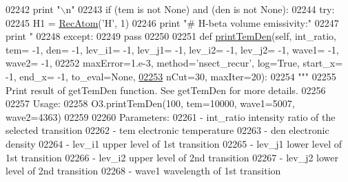 \begin{DoxyCode}
{{{{{{{{{{{{{02242             \textcolor{keywordflow}{print} \textcolor{stringliteral}{"\(\backslash\)n"}
02243         \textcolor{keywordflow}{if} (tem \textcolor{keywordflow}{is} \textcolor{keywordflow}{not} \textcolor{keywordtype}{None}) \textcolor{keywordflow}{and} (den \textcolor{keywordflow}{is} \textcolor{keywordflow}{not} \textcolor{keywordtype}{None}):
02244             \textcolor{keywordflow}{try}:
02245                 H1 = \hyperlink{classpyneb_1_1core_1_1pynebcore_1_1_rec_atom}{RecAtom}(\textcolor{stringliteral}{'H'}, 1)
02246                 \textcolor{keywordflow}{print} \textcolor{stringliteral}{"# H-beta volume emissivity:"}
02247                 \textcolor{keywordflow}{print} \textcolor{stringliteral}{"%
02248             \textcolor{keywordflow}{except}:
02249                 \textcolor{keywordflow}{pass}
02250 
02251     \textcolor{keyword}{def }\hyperlink{classpyneb_1_1core_1_1pynebcore_1_1_atom_a0b95239f3b76bbd0e42da220370ff866}{printTemDen}(self, int\_ratio, tem= -1, den= -1, lev\_i1= -1, lev\_j1= -1, lev\_i2= -1, 
      lev\_j2= -1, wave1= -1, wave2= -1,
02252                     maxError=1.e-3, method=\textcolor{stringliteral}{'nsect\_recur'}, log=\textcolor{keyword}{True}, start\_x= -1, end\_x= -1, to\_eval=\textcolor{keywordtype}{None},
\hypertarget{pynebcore_8py_source_l02253}{}\hyperlink{classpyneb_1_1core_1_1pynebcore_1_1_atom_a0b95239f3b76bbd0e42da220370ff866}{02253}                     nCut=30, maxIter=20):
02254         \textcolor{stringliteral}{""" }
02255 \textcolor{stringliteral}{        Print result of getTemDen function. See getTemDen for more details.}
02256 \textcolor{stringliteral}{        }
02257 \textcolor{stringliteral}{        Usage:}
02258 \textcolor{stringliteral}{            O3.printTemDen(100, tem=10000, wave1=5007, wave2=4363)}
02259 \textcolor{stringliteral}{        }
02260 \textcolor{stringliteral}{        Parameters:}
02261 \textcolor{stringliteral}{            - int\_ratio    intensity ratio of the selected transition}
02262 \textcolor{stringliteral}{            - tem          electronic temperature}
02263 \textcolor{stringliteral}{            - den          electronic density}
02264 \textcolor{stringliteral}{            - lev\_i1       upper level of 1st transition}
02265 \textcolor{stringliteral}{            - lev\_j1       lower level of 1st transition}
02266 \textcolor{stringliteral}{            - lev\_i2       upper level of 2nd transition}
02267 \textcolor{stringliteral}{            - lev\_j2       lower level of 2nd transition}
02268 \textcolor{stringliteral}{            - wave1        wavelength of 1st transition}
}}}}}}}}}}}}}}
\end{DoxyCode}
